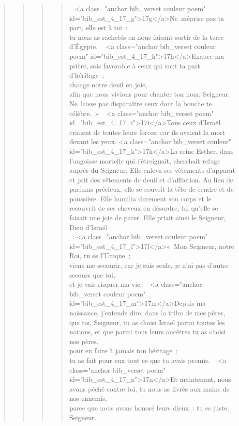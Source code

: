 \begin{verse}
\begin{verse}
\begin{verse}
\begin{verse}
         
        <a class="anchor bib_verset couleur poem" id="bib_est_4_17_g">17g</a>Ne méprise pas ta part,
        elle est à toi :
        \\tu nous as rachetés
        en nous faisant sortir de la terre d’Égypte.
         
        <a class="anchor bib_verset couleur poem" id="bib_est_4_17_h">17h</a>Exauce ma prière,
        sois favorable à ceux qui sont ta part d’héritage ;
        \\change notre deuil en joie,
        \\afin que nous vivions
        pour chanter ton nom, Seigneur.
        \\Ne laisse pas disparaître
        ceux dont la bouche te célèbre. »
         
        <a class="anchor bib_verset poem" id="bib_est_4_17_i">17i</a>Tous ceux d’Israël criaient de toutes leurs forces, car ils avaient la mort devant les yeux.
      <a class="anchor bib_verset couleur" id="bib_est_4_17_k">17k</a>La reine Esther, dans l’angoisse mortelle qui l’étreignait, cherchait refuge auprès du Seigneur. Elle enleva ses vêtements d’apparat et prit des vêtements de deuil et d’affliction. Au lieu de parfums précieux, elle se couvrit la tête de cendre et de poussière. Elle humilia durement son corps et le recouvrit de ses cheveux en désordre, lui qu’elle se faisait une joie de parer. Elle priait ainsi le Seigneur, Dieu d’Israël\\ :
        <a class="anchor bib_verset couleur poem" id="bib_est_4_17_l">17l</a>« Mon Seigneur, notre Roi,
        tu es l’Unique ;
        \\viens me secourir, car je suis seule,
        je n’ai pas d’autre secours que toi,
        \\et je vais risquer ma vie.
         
        <a class="anchor bib_verset couleur poem" id="bib_est_4_17_m">17m</a>Depuis ma naissance, j’entends dire,
        dans la tribu de mes pères,
        \\que toi, Seigneur, tu as choisi Israël parmi toutes les nations,
        et que parmi tous leurs ancêtres tu as choisi nos pères,
        \\pour en faire à jamais ton héritage ;
        \\tu as fait pour eux tout ce que tu avais promis.
         
        <a class="anchor bib_verset poem" id="bib_est_4_17_n">17n</a>Et maintenant, nous avons péché contre toi,
        tu nous as livrés aux mains de nos ennemis,
        \\parce que nous avons honoré leurs dieux :
        tu es juste, Seigneur.

\end{verse}
\end{verse}
\end{verse}
\end{verse}
